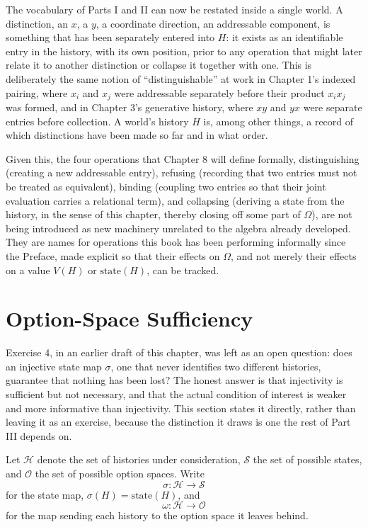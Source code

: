 \documentclass[11pt]{book}
\begin{document}
The vocabulary of Parts I and II can now be restated inside a single world. A distinction, an $x$, a $y$, a coordinate direction, an addressable component, is something that has been separately entered into $H$: it exists as an identifiable entry in the history, with its own position, prior to any operation that might later relate it to another distinction or collapse it together with one. This is deliberately the same notion of ``distinguishable'' at work in Chapter 1's indexed pairing, where $x_i$ and $x_j$ were addressable separately before their product $x_ix_j$ was formed, and in Chapter 3's generative history, where $xy$ and $yx$ were separate entries before collection. A world's history $H$ is, among other things, a record of which distinctions have been made so far and in what order.

Given this, the four operations that Chapter 8 will define formally, distinguishing (creating a new addressable entry), refusing (recording that two entries must not be treated as equivalent), binding (coupling two entries so that their joint evaluation carries a relational term), and collapsing (deriving a state from the history, in the sense of this chapter, thereby closing off some part of $\Omega$), are not being introduced as new machinery unrelated to the algebra already developed. They are names for operations this book has been performing informally since the Preface, made explicit so that their effects on $\Omega$, and not merely their effects on a value $V(H)$ or $\mathrm{state}(H)$, can be tracked.

\section{Option-Space Sufficiency}

Exercise 4, in an earlier draft of this chapter, was left as an open question: does an injective state map $\sigma$, one that never identifies two different histories, guarantee that nothing has been lost? The honest answer is that injectivity is sufficient but not necessary, and that the actual condition of interest is weaker and more informative than injectivity. This section states it directly, rather than leaving it as an exercise, because the distinction it draws is one the rest of Part III depends on.

Let $\mathcal H$ denote the set of histories under consideration, $\mathcal S$ the set of possible states, and $\mathcal O$ the set of possible option spaces. Write
\[
\sigma:\mathcal H \to \mathcal S
\]
for the state map, $\sigma(H)=\mathrm{state}(H)$, and
\[
\omega:\mathcal H \to \mathcal O
\]
for the map sending each history to the option space it leaves behind.
\end{document}
